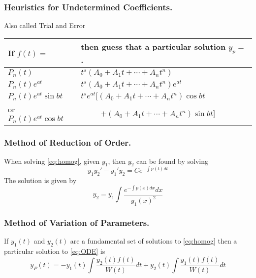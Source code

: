 \documentclass[../../main.tex]{subfiles}
\begin{document}
\subsubsection*{Heuristics for Undetermined Coefficients.} Also called Trial and Error
\begin{center}
\begin{tabular}{|l|l|}
\hline 
If $f(t)=$ & then guess that a particular solution $y_p=$. \\
\hline\hline
$P_n(t)$ & $t^s (A_0 + A_1 t + \cdots + A_n t^n)$ \\
\hline 
$P_n(t)e^{at}$ & $t^s (A_0 + A_1 t + \cdots + A_n t^n)e^{at}$ \\
\hline
$P_n(t)e^{at}\sin bt$ & $t^s e^{at} [(A_0 + A_1 t + \cdots + A_n t^n)\cos bt$ \\
or $P_n(t)e^{at}\cos bt$ & \ \ \ \ \ $ + (A_0 + A_1 t + \cdots + A_n t^n)\sin bt]$ \\
\hline 
\end{tabular}
\end{center}


\subsubsection*{Method of Reduction of Order.} When solving \eqref{eq:homog}, given $y_1$, then $y_2$ can be found by solving
\begin{equation*}
y_1 y_2' - y_1'y_2 = Ce^{-\int p(t) dt}
\end{equation*}
The solution is given by 
\begin{equation}
y_2 = y_1\int \dfrac{e^{-\int p(x) dx} dx}{y_1(x)^2}\label{eq:ROE}
\end{equation}

\subsubsection*{Method of Variation of Parameters.} If $y_1(t)$ and $y_2(t)$ are a fundamental set of solutions to \eqref{eq:homog} then a particular solution to \eqref{eq:ODE} is 
\begin{equation}
y_P (t) = -y_1(t) \int \dfrac{y_2(t) f(t)}{W(t)}dt + y_2(t) \int \dfrac{y_1(t) f(t)}{W(t)}dt 
\end{equation}
\end{document}
